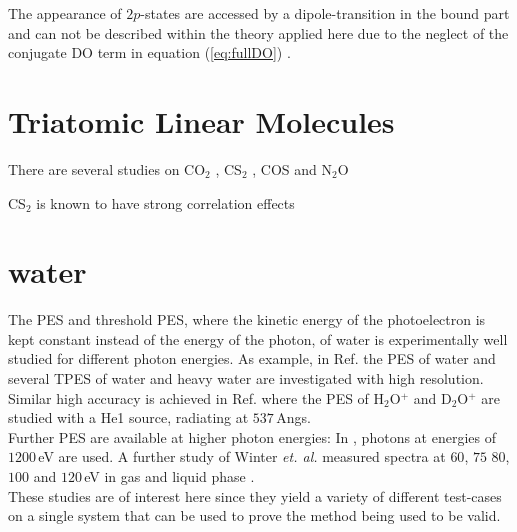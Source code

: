 The appearance of $2p$-states are accessed by a dipole-transition in the bound part and can not be described within the theory applied here due to the neglect of the conjugate DO term in equation (\ref{eq:fullDO}) \cite{saPonzi}.

\section{Triatomic Linear Molecules}
There are several studies on CO$_2$ \cite{CO2, CO2_highres, HighResLinear, DiffLinear}, CS$_2$ \cite{DiffLinear,HighResLinear}, COS \cite{DiffLinear,HighResLinear} and N$_2$O \cite{DiffLinear}

CS$_2$ is known to have strong correlation effects \cite{2phcederbaum}

\section{water}
The PES and threshold PES, where the kinetic energy of the photoelectron is kept constant instead of the energy of the photon, of water is experimentally well studied 
for different photon energies.
As example, in Ref. \cite{waterTPE} the PES of water and several TPES of water and heavy water are investigated with high resolution.\\
Similar high accuracy is achieved in Ref. \cite{waterHePES} where the PES of H$_2$O$^+$ and D$_2$O$^+$ are studied with a He1 source, radiating at $537\,$Angs.\\
Further PES are available at higher photon energies:
In \cite{water1200}, photons at energies of $1200\,$eV are used.
A further study of Winter \textit{et. al.} measured spectra at $60$, $75$ $80$, $100$ and $120\,$eV in gas and liquid phase \cite{winterWater}.\\
These studies are of interest here since they yield a variety of different test-cases on a single system that can be used to prove the method being used to be valid.
